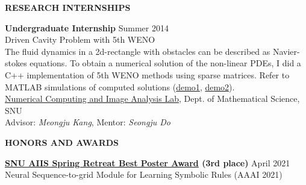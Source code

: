 \documentclass[12pt]{article}
\begin{document}

\begin{center}
	{\noindent \bfseries RESEARCH INTERNSHIPS}
    \noindent\makebox[\linewidth]{\rule{0.75\paperwidth}{0.4pt}}
\end{center} 

\vspace{8pt} %

\noindent
{\bfseries Undergraduate Internship} \hfill Summer 2014 \\ 
Driven Cavity Problem with 5th WENO \\ 
The fluid dynamics in a 2d-rectangle with obstacles can be described as Navier-stokes equations.
To obtain a numerical solution of the non-linear PDEs, I did a C++ implementation of 5th WENO methods using sparse matrices.
Refer to MATLAB simulations of computed solutions (\href{https://segwangkim.github.io/notes/fluid1.gif}{demo1}, \href{https://segwangkim.github.io/notes/fluid2.gif}{demo2}).\\
\noindent \href{http://ncia.snu.ac.kr/xe/}{Numerical Computing and Image Analysis Lab}, Dept. of Mathematical Science, SNU\\ 
Advisor: \textit{Meongju Kang}, Mentor: \textit{Seongju Do}


\vspace{0.2in} %


\begin{center}
	{\noindent \bfseries HONORS AND AWARDS}
    \noindent\makebox[\linewidth]{\rule{0.75\paperwidth}{0.4pt}}
\end{center}

\noindent
{\bfseries \href{https://aiis.snu.ac.kr/bbs/board.php?bo_table=sub5_1&wr_id=144&page=4&lan=}{SNU AIIS Spring Retreat Best Poster Award} (3rd place)} \hfill April 2021 \\ 
\noindent Neural Sequence-to-grid Module for Learning Symbolic Rules (AAAI 2021) \\ 
\end{document}
